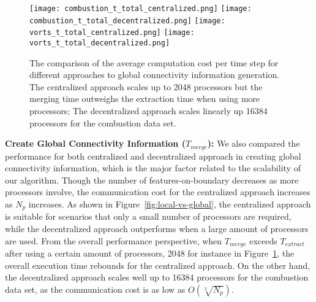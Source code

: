 \begin{figure}[t]
\centering
\texttt{[image: combustion\_t\_total\_centralized.png]}
\texttt{[image: combustion\_t\_total\_decentralized.png]}
\texttt{[image: vorts\_t\_total\_centralized.png]}
\texttt{[image: vorts\_t\_total\_decentralized.png]}
\caption{The comparison of the average computation cost per time step for different approaches to global connectivity information generation. The centralized approach scales up to 2048 processors but the merging time outweighs the extraction time when using more processors; The decentralized approach scales linearly up 16384 processors for the combustion data set.}
\label{fig:global-merge}
\end{figure}

\textbf{Create Global Connectivity Information ($T_{merge}$): }
We also compared the performance for both centralized and decentralized approach in creating global connectivity information, which is the major factor related to the scalability of our algorithm. Though the number of features-on-boundary decreases as more processors involve, the communication cost for the centralized approach increases as $N_p$ increases. As shown in Figure~\ref{fig:local-vs-global}, the centralized approach is suitable for scenarios that only a small number of processors are required, while the decentralized approach outperforms when a large amount of processors are used. From the overall performance perspective, when $T_{merge}$ exceeds $T_{extract}$ after using a certain amount of processors, 2048 for instance in Figure~\ref{fig:global-merge}, the overall execution time rebounds for the centralized approach. On the other hand, the decentralized approach scales well up to 16384 processors for the combustion data set, as the communication cost is as low as ${O(\sqrt[3]{N_p})}$.